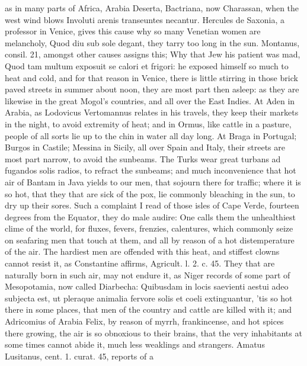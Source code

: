 {as in many parts of Africa, Arabia Deserta, Bactriana, now Charassan,
when the west wind blows Involuti arenis transeuntes necantur.
Hercules de Saxonia, a professor in Venice, gives this cause why
so many Venetian women are melancholy, Quod diu sub sole degant, they
tarry too long in the sun. Montanus, consil. 21, amongst other causes
assigns this; Why that Jew his patient was mad, Quod tam multum
exposuit se calori et frigori: he exposed himself so much to heat and
cold, and for that reason in Venice, there is little stirring in those
brick paved streets in summer about noon, they are most part then
asleep: as they are likewise in the great Mogol's countries, and all
over the East Indies. At Aden in Arabia, as  Lodovicus
Vertomannus relates in his travels, they keep their markets in the
night, to avoid extremity of heat; and in Ormus, like cattle in a
pasture, people of all sorts lie up to the chin in water all day long.
At Braga in Portugal; Burgos in Castile; Messina in Sicily, all over
Spain and Italy, their streets are most part narrow, to avoid the
sunbeams. The Turks wear great turbans ad fugandos solis radios, to
refract the sunbeams; and much inconvenience that hot air of Bantam in
Java yields to our men, that sojourn there for traffic; where it is so
hot, that they that are sick of the pox, lie commonly bleaching
in the sun, to dry up their sores. Such a complaint I read of those
isles of Cape Verde, fourteen degrees from the Equator, they do male
audire: One calls them the unhealthiest clime of the world, for
fluxes, fevers, frenzies, calentures, which commonly seize on seafaring
men that touch at them, and all by reason of a hot distemperature of
the air. The hardiest men are offended with this heat, and stiffest
clowns cannot resist it, as Constantine affirms, Agricult. l. 2. c. 45.
They that are naturally born in such air, may not endure it, as
Niger records of some part of Mesopotamia, now called Diarbecha:
Quibusdam in locis saevienti aestui adeo subjecta est, ut pleraque
animalia fervore solis et coeli extinguantur, 'tis so hot there in some
places, that men of the country and cattle are killed with it; and
Adricomius of Arabia Felix, by reason of myrrh, frankincense, and
hot spices there growing, the air is so obnoxious to their brains, that
the very inhabitants at some times cannot abide it, much less weaklings
and strangers. Amatus Lusitanus, cent. 1. curat. 45, reports of a
}
